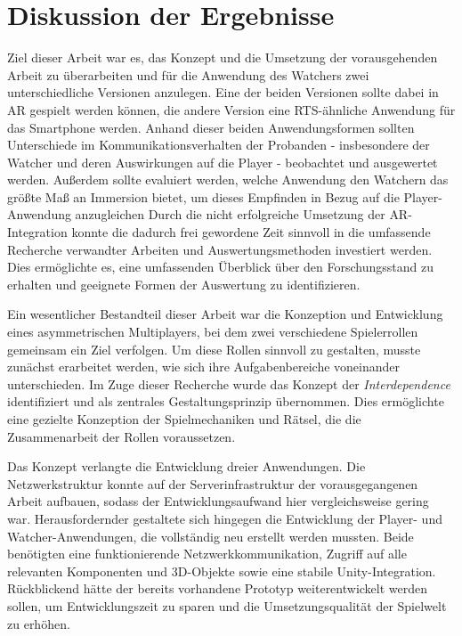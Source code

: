 \chapter{Diskussion der Ergebnisse} 
Ziel dieser Arbeit war es, das Konzept und die Umsetzung der vorausgehenden Arbeit zu überarbeiten und für die Anwendung des Watchers zwei unterschiedliche Versionen anzulegen. Eine der beiden Versionen sollte dabei in \ac{AR} gespielt werden können, die andere Version eine \ac{RTS}-ähnliche Anwendung für das Smartphone werden. Anhand dieser beiden Anwendungsformen sollten Unterschiede im Kommunikationsverhalten der Probanden - insbesondere der Watcher und deren Auswirkungen auf die Player - beobachtet und ausgewertet werden. Außerdem sollte evaluiert werden, welche Anwendung den Watchern das größte Maß an Immersion bietet, um dieses Empfinden in Bezug auf die Player-Anwendung anzugleichen
Durch die nicht erfolgreiche Umsetzung der \ac{AR}-Integration konnte die dadurch frei gewordene Zeit sinnvoll in die umfassende Recherche verwandter Arbeiten und Auswertungsmethoden investiert werden. Dies ermöglichte es, eine umfassenden Überblick über den Forschungsstand zu erhalten und geeignete Formen der Auswertung zu identifizieren.

Ein wesentlicher Bestandteil dieser Arbeit war die Konzeption und Entwicklung eines asymmetrischen Multiplayers, bei dem zwei verschiedene Spielerrollen gemeinsam ein Ziel verfolgen. Um diese Rollen sinnvoll zu gestalten, musste zunächst erarbeitet werden, wie sich ihre Aufgabenbereiche voneinander unterschieden. Im Zuge dieser Recherche wurde das Konzept der \textit{Interdependence} identifiziert und als zentrales Gestaltungsprinzip übernommen. Dies ermöglichte eine gezielte Konzeption der Spielmechaniken und Rätsel, die die Zusammenarbeit der Rollen voraussetzen.

Das Konzept verlangte die Entwicklung dreier Anwendungen. Die Netzwerkstruktur konnte auf der Serverinfrastruktur der vorausgegangenen Arbeit aufbauen, sodass der Entwicklungsaufwand hier vergleichsweise gering war. Herausfordernder gestaltete sich hingegen die Entwicklung der Player- und Watcher-Anwendungen, die vollständig neu erstellt werden mussten. Beide benötigten eine funktionierende Netzwerkkommunikation, Zugriff auf alle relevanten Komponenten und \ac{3D}-Objekte sowie eine stabile Unity-Integration. Rückblickend hätte der bereits vorhandene Prototyp weiterentwickelt werden sollen, um Entwicklungszeit zu sparen und die Umsetzungsqualität der Spielwelt zu erhöhen.

